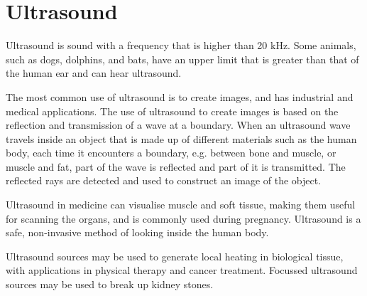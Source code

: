 \section{Ultrasound}

Ultrasound is sound with a frequency that is higher than 20 kHz. Some animals, such as dogs, dolphins, and bats, have an upper limit that is greater than that of the human ear and can hear ultrasound.

The most common use of ultrasound is to create images, and has industrial and medical applications. The use of ultrasound to create images is based on the reflection and transmission of a wave at a boundary. When an ultrasound wave travels inside an object that is made up of different materials such as the human body, each time it encounters a boundary, e.g. between bone and muscle, or muscle and fat, part of the wave is reflected and part of it is transmitted. The reflected rays are detected and used to construct an image of the object.

Ultrasound in medicine can visualise muscle and soft tissue, making them useful for scanning the organs, and is commonly used during pregnancy. Ultrasound is a safe, non-invasive method of looking inside the human body.

Ultrasound sources may be used to generate local heating in biological tissue, with applications in physical therapy and cancer treatment. Focussed ultrasound sources may be used to break up kidney stones.

